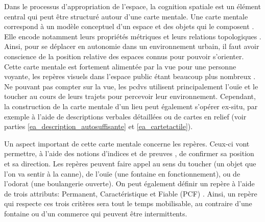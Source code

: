 

\newpar{}

Dans le processus d'appropriation de l'espace, la cognition spatiale est un élément central qui peut être structuré autour d'une carte mentale. Une carte mentale correspond à un modèle conceptuel d'un espace et des objets qui le composent \citep{Jacobson1998}. Elle encode notamment leurs propriétés métriques et leurs relations topologiques \citep{Denis1992}. Ainsi, pour se déplacer en autonomie dans un environnement urbain, il faut avoir conscience de la position relative des espaces connus pour pouvoir s'orienter. Cette carte mentale est fortement alimentée par la vue pour une personne voyante, les repères visuels dans l'espace public étant beaucoup plus nombreux \citep{thinus1997}. Ne pouvant pas compter sur la vue, les \glspl{pcdv} utilisent principalement l'ouïe et le toucher au cours de leurs trajets pour percevoir leur environnement. Cependant, la construction de la carte mentale d'un lieu peut également s'opérer ex-situ, par exemple à l'aide de descriptions verbales détaillées ou de cartes en relief (voir parties \ref{ea_description_autosuffisante} et \ref{ea_cartetactile}).

\newpar{}

Un aspect important de cette carte mentale concerne les repères. Ceux-ci vont permettre, à l'aide des notions d'indices et de preuves \citep{Giudice2010}, de confirmer sa position et sa direction. Les repères peuvent faire appel au sens du toucher (un objet que l'on va sentir à la canne), de l'ouïe (une fontaine en fonctionnement), ou de l'odorat (une boulangerie ouverte). On peut également définir un repère à l'aide de trois attributs: Permanent, Caractéristique et Fiable (PCF) \citep{Denis2023}. Ainsi, un repère qui respecte ces trois critères sera tout le temps mobilisable, au contraire d'une fontaine ou d'un commerce qui peuvent être intermittents. 


